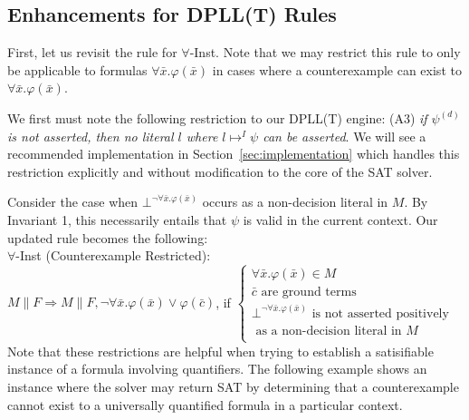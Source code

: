 \documentclass{llncs}
\begin{document}
\subsection{Enhancements for DPLL(T) Rules}

First, let us revisit the rule for $\forall$-Inst.
Note that we may restrict this rule to only be applicable to formulas $\forall \bar{x}. \varphi( \bar{ x } )$ in cases where a counterexample can exist to $\forall \bar{x}. \varphi( \bar{ x } )$.

We first must note the following restriction to our DPLL(T) engine: (A3) \emph{if $\psi^{(d)}$ is not asserted, then no literal $l$ where $l \mapsto^I \psi$ can be asserted}.
We will see a recommended implementation in Section~\ref{sec:implementation} which handles this restriction explicitly and without modification to the core of the SAT solver.

Consider the case when $\bot^{\neg \forall \bar{x}. \varphi( \bar{ x } )}$ occurs as a non-decision literal in $M$.
By Invariant 1, this necessarily entails that $\psi$ is valid in the current context.
Our updated rule becomes the following: \\

\noindent $\forall$-Inst (Counterexample Restricted): \\

$M \parallel F \Longrightarrow M \parallel F, \neg \forall \bar{x}. \varphi( \bar{ x } ) \vee \varphi( \bar{ c } )$, if   
$\begin{cases}
  \forall \bar{x}. \varphi( \bar{ x } ) \in M \\
  \bar{ c } \text{ are ground terms} \\
  \bot^{\neg \forall \bar{x}. \varphi( \bar{ x } )} \text{ is not asserted positively }\\
  \text{ \ \ \ as a non-decision literal in $M$ } \\    
\end{cases}$ \\

Note that these restrictions are helpful when trying to establish a satisifiable instance of a formula involving quantifiers.
The following example shows an instance where the solver may return SAT by determining that a counterexample cannot exist to a universally quantified formula in a particular context.
\end{document}
